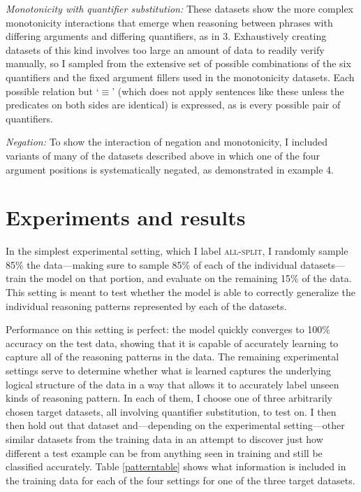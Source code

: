 \noindent\textit{Monotonicity with quantifier substitution:} These datasets show the more complex monotonicity interactions that emerge when reasoning between phrases with differing arguments and differing quantifiers, as in  3. 
Exhaustively creating datasets of this kind involves too large an amount of data to readily verify manually, so I sampled  from the extensive set of possible combinations of the six quantifiers and the fixed argument fillers used in the monotonicity datasets. Each possible relation but `$\equiv$' (which does not apply sentences like these unless the predicates on both sides are identical) is expressed, as is every possible pair of quantifiers.

\noindent\textit{Negation:}
To show the interaction of negation and monotonicity, I included variants of many of the datasets described above in which one of the four argument positions is systematically negated, as demonstrated in example 4. 

\section{Experiments and results}


In the simplest experimental setting, which I label \textsc{all-split}, I randomly sample 85\% the data---making sure to sample 85\% of each of the individual datasets---train the model on that portion, and evaluate on the remaining 15\% of the data. This setting is meant to test whether the model is able to correctly generalize the individual reasoning patterns represented by each of the datasets. 

Performance on this setting is perfect: the model quickly converges to 100\% accuracy on the test data, showing that it is capable of accurately learning to capture all of the reasoning patterns in the data. The remaining experimental settings serve to determine whether what is learned captures the underlying logical structure of the data in a way that allows it to accurately label unseen kinds of reasoning pattern. In each of them, I choose one of three arbitrarily chosen target datasets, all involving quantifier substitution, to test on. I then then hold out that dataset and---depending on the experimental setting---other similar datasets from the training data in an attempt to discover just how different a test example can be from anything seen in training and still be classified accurately. Table \ref{patterntable} shows what information is included in the training data for each of the four settings for one of the three target datasets. 

